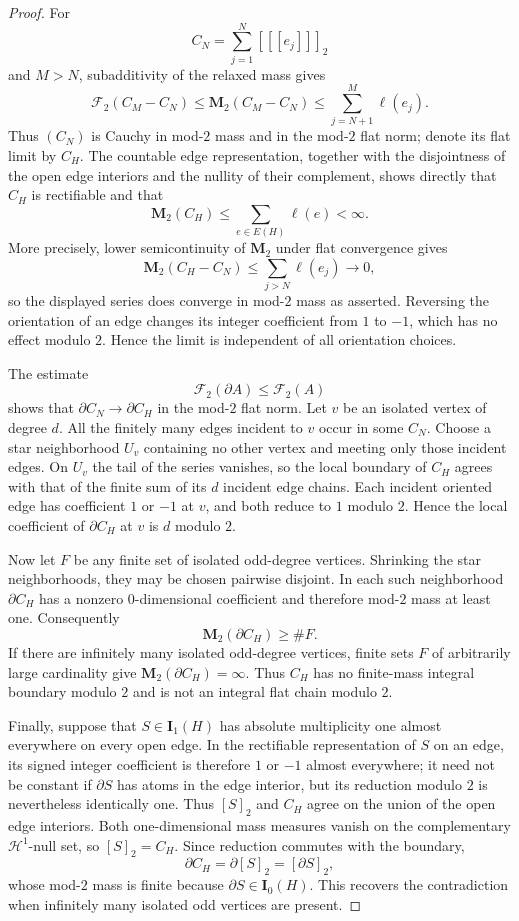\documentclass[10pt,a4paper]{amsart}
\newcommand{\Hh}{\mathcal H}
\newcommand{\I}{\mathbf I}
\newcommand{\M}{\mathbf M}
\newcommand{\llbracket}{[\![}
\newcommand{\rrbracket}{]\!]}
\begin{document}
\begin{proof}
For
\[
       C_N=\sum_{j=1}^{N}[\llbracket e_j\rrbracket]_2
\]
and $M>N$, subadditivity of the relaxed mass gives
\[
 \mathcal F_2(C_M-C_N)
 \le \M_2(C_M-C_N)
 \le \sum_{j=N+1}^{M}\ell(e_j).
\]
Thus $(C_N)$ is Cauchy in mod-$2$ mass and in the mod-$2$ flat norm; denote
its flat limit by $C_H$. The countable edge representation, together with
the disjointness of the open edge interiors and the nullity of their
complement, shows directly that $C_H$ is rectifiable and that
\[
       \M_2(C_H)\le \sum_{e\in E(H)}\ell(e)<\infty.
\]
More precisely, lower semicontinuity of $\M_2$ under flat convergence gives
\[
       \M_2(C_H-C_N)
       \le \sum_{j>N}\ell(e_j)\longrightarrow0,
\]
so the displayed series does converge in mod-$2$ mass as asserted.
Reversing the orientation of an edge changes its integer coefficient from
$1$ to $-1$, which has no effect modulo $2$. Hence the limit is independent
of all orientation choices.

The estimate
\[
       \mathcal F_2(\partial A)\le \mathcal F_2(A)
\]
shows that $\partial C_N\to\partial C_H$ in the mod-$2$ flat norm. Let $v$
be an isolated vertex of degree $d$. All the finitely many edges incident to
$v$ occur in some $C_N$. Choose a star neighborhood $U_v$ containing no
other vertex and meeting only those incident edges. On $U_v$ the tail of the
series vanishes, so the local boundary of $C_H$ agrees with that of the
finite sum of its $d$ incident edge chains. Each incident oriented edge has
coefficient $1$ or $-1$ at $v$, and both reduce to $1$ modulo $2$. Hence the
local coefficient of $\partial C_H$ at $v$ is $d$ modulo $2$.

Now let $F$ be any finite set of isolated odd-degree vertices. Shrinking the
star neighborhoods, they may be chosen pairwise disjoint. In each such
neighborhood $\partial C_H$ has a nonzero $0$-dimensional coefficient and
therefore mod-$2$ mass at least one. Consequently
\[
       \M_2(\partial C_H)\ge \#F.
\]
If there are infinitely many isolated odd-degree vertices, finite sets $F$
of arbitrarily large cardinality give
$\M_2(\partial C_H)=\infty$. Thus $C_H$ has no finite-mass integral boundary
modulo $2$ and is not an integral flat chain modulo $2$.

Finally, suppose that $S\in\I_1(H)$ has absolute multiplicity one almost
everywhere on every open edge. In the rectifiable representation of $S$ on
an edge, its signed integer coefficient is therefore $1$ or $-1$ almost
everywhere; it need not be constant if $\partial S$ has atoms in the edge
interior, but its reduction modulo $2$ is nevertheless identically one.
Thus $[S]_2$ and $C_H$ agree on the union of the open edge interiors. Both
one-dimensional mass measures vanish on the complementary $\Hh^1$-null
set, so $[S]_2=C_H$. Since reduction commutes with the boundary,
\[
       \partial C_H=\partial[S]_2=[\partial S]_2,
\]
whose mod-$2$ mass is finite because $\partial S\in\I_0(H)$. This recovers
the contradiction when infinitely many isolated odd vertices are present.
\end{proof}
\end{document}
